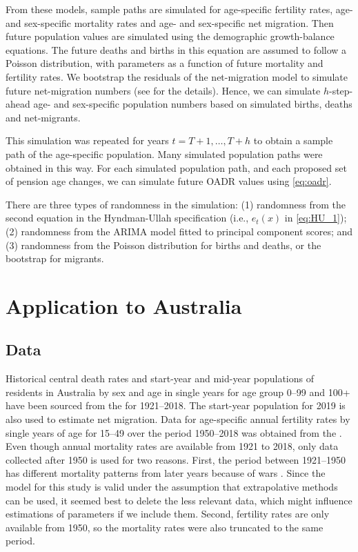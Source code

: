 \documentclass[11pt,a4paper,]{article}
\begin{document}
From these models, sample paths are simulated for age-specific fertility rates, age- and sex-specific mortality rates and age- and sex-specific net migration. Then future population values are simulated using the demographic growth-balance equations. The future deaths and births in this equation are assumed to follow a Poisson distribution, with parameters as a function of future mortality and fertility rates. We bootstrap the residuals of the net-migration model to simulate future net-migration numbers (see \textcite{HB08} for the details). Hence, we can simulate \(h\)-step-ahead age- and sex-specific population numbers based on simulated births, deaths and net-migrants.

This simulation was repeated for years \(t=T+1,\dots,T+h\) to obtain a sample path of the age-specific population. Many simulated population paths were obtained in this way. For each simulated population path, and each proposed set of pension age changes, we can simulate future OADR values using \eqref{eq:oadr}.

There are three types of randomness in the simulation: (1) randomness from the second equation in the Hyndman-Ullah specification (i.e., \(e_t(x)\) in \eqref{eq:HU_1}); (2) randomness from the ARIMA model fitted to principal component scores; and (3) randomness from the Poisson distribution for births and deaths, or the bootstrap for migrants.

\hypertarget{sec:results}{%
\section{Application to Australia}\label{sec:results}}

\hypertarget{data}{%
\subsection{Data}\label{data}}

Historical central death rates and start-year and mid-year populations of residents in Australia by sex and age in single years for age group 0--99 and 100+ have been sourced from the \textcite{HMD} for 1921--2018. The start-year population for 2019 is also used to estimate net migration. Data for age-specific annual fertility rates by single years of age for 15--49 over the period 1950--2018 was obtained from the \textcite{ABSBirths}. Even though annual mortality rates are available from 1921 to 2018, only data collected after 1950 is used for two reasons. First, the period between 1921--1950 has different mortality patterns from later years because of wars \autocite{HB08}. Since the model for this study is valid under the assumption that extrapolative methods can be used, it seemed best to delete the less relevant data, which might influence estimations of parameters if we include them. Second, fertility rates are only available from 1950, so the mortality rates were also truncated to the same period.
\end{document}
